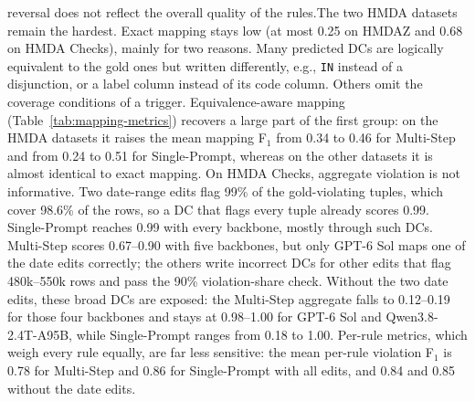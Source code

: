 {reversal does not reflect the overall quality of the rules.}{The two HMDA datasets remain the hardest. Exact mapping stays low (at most 0.25 on HMDAZ and 0.68 on HMDA Checks), mainly for two reasons. Many predicted DCs are logically equivalent to the gold ones but written differently, e.g., \texttt{IN} instead of a disjunction, or a label column instead of its code column. Others omit the coverage conditions of a trigger. Equivalence-aware mapping (Table~\ref{tab:mapping-metrics}) recovers a large part of the first group: on the HMDA datasets it raises the mean mapping F$_1$ from 0.34 to 0.46 for Multi-Step and from 0.24 to 0.51 for Single-Prompt, whereas on the other datasets it is almost identical to exact mapping. On HMDA Checks, aggregate violation is not informative. Two date-range edits flag 99\% of the gold-violating tuples, which cover 98.6\% of the rows, so a DC that flags every tuple already scores 0.99. Single-Prompt reaches 0.99 with every backbone, mostly through such DCs. Multi-Step scores 0.67--0.90 with five backbones, but only GPT-6 Sol maps one of the date edits correctly; the others write incorrect DCs for other edits that flag 480k--550k rows and pass the 90\% violation-share check. Without the two date edits, these broad DCs are exposed: the Multi-Step aggregate falls to 0.12--0.19 for those four backbones and stays at 0.98--1.00 for GPT-6 Sol and Qwen3.8-2.4T-A95B, while Single-Prompt ranges from 0.18 to 1.00. Per-rule metrics, which weigh every rule equally, are far less sensitive: the mean per-rule violation F$_1$ is 0.78 for Multi-Step and 0.86 for Single-Prompt with all edits, and 0.84 and 0.85 without the date edits.}

\begin{table}[!ht]
  \centering
  \caption{Mean mapping quality over the six datasets (ground-truth sentences
  only). CM: exact mapping F$_1$; CM$_{\equiv}$: equivalence-aware mapping
  F$_1$; AV: aggregate violation F$_1$; Rule-F$_1$: mean per-rule violation F$_1$;
  Exec.: execution equivalence; Fail.: sentences with no valid model output.}
  \label{tab:mapping-metrics}
  \small
  \setlength{\tabcolsep}{3.5pt}
  \resizebox{\columnwidth}{!}{}
\end{table}

